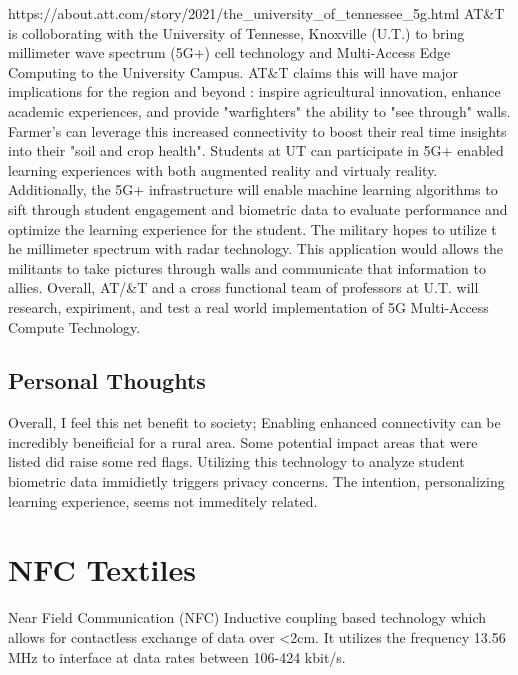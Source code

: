 \documentclass{article}
\begin{document}
https://about.att.com/story/2021/the_university_of_tennessee_5g.html
AT\&T is colloborating with the University of Tennesse, Knoxville (U.T.) to bring millimeter wave spectrum
(5G+) cell technology and Multi-Access Edge Computing to the University Campus. AT\&T claims this will have major 
implications for the region and beyond : inspire agricultural innovation, enhance academic experiences, and provide "warfighters"
the ability to "see through" walls. Farmer's can leverage this  increased connectivity to boost 
their real time insights into their "soil and crop health".
Students at UT  can participate in 5G+ enabled learning experiences with both
augmented reality and virtualy reality. Additionally, the 5G+ infrastructure
will enable machine learning algorithms to sift through student engagement and biometric data to evaluate performance and optimize the learning experience for the student.
The military hopes to utilize t he millimeter spectrum with radar technology. This application would allows the militants to take pictures through walls and communicate
that information to allies. Overall, AT/&T and a cross functional team of professors at U.T. will  research, expiriment, and test a real world implementation of 5G  Multi-Access Compute Technology.

\subsection*{Personal Thoughts}
Overall, I feel this net benefit to society; Enabling enhanced connectivity can be incredibly beneificial for a rural area.
Some potential impact areas that were listed did raise some red flags.
Utilizing this technology to analyze student biometric data immidietly triggers privacy concerns. The intention, personalizing learning experience,
seems not immeditely related. 

\section*{NFC Textiles}


Near Field Communication (NFC)
Inductive coupling based technology which allows for contactless exchange of data over <2cm. 
It utilizes the frequency 13.56 MHz to interface at data rates between 106-424 kbit/s.
\end{document}
